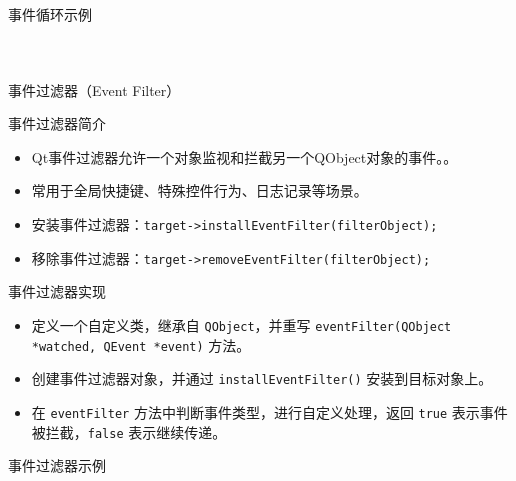 \documentclass[UTF8,aspectratio=169]{beamer}
\begin{document}
\begin{frame}[fragile]{事件循环示例}
    \begin{columns}
        \begin{column}{0.48\textwidth}
            \inputminted[firstline=1,lastline=20]{cpp}{code/qt_event_loop_example.cpp}
        \end{column}
        \begin{column}{0.48\textwidth}
            \inputminted[firstline=21,lastline=40]{cpp}{code/qt_event_loop_example.cpp}
        \end{column}
    \end{columns}
\end{frame}

\begin{frame}[fragile]{事件过滤器（Event Filter）}
    \begin{ytublock}{事件过滤器简介}
        \begin{itemize}
            \item Qt事件过滤器允许一个对象监视和拦截另一个QObject对象的事件。。
            \item 常用于全局快捷键、特殊控件行为、日志记录等场景。
            \item 安装事件过滤器：\texttt{target->installEventFilter(filterObject);}
            \item 移除事件过滤器：\texttt{target->removeEventFilter(filterObject);}
        \end{itemize}
    \end{ytublock}
    \begin{ytublock}{事件过滤器实现}
        \begin{itemize}
            \item 定义一个自定义类，继承自 \texttt{QObject}，并重写 \texttt{eventFilter(QObject *watched, QEvent *event)} 方法。
            \item 创建事件过滤器对象，并通过 \texttt{installEventFilter()} 安装到目标对象上。
            \item 在 \texttt{eventFilter} 方法中判断事件类型，进行自定义处理，返回 \texttt{true} 表示事件被拦截，\texttt{false} 表示继续传递。
        \end{itemize}
    \end{ytublock}
\end{frame}

\begin{frame}[fragile]{事件过滤器示例}
    \begin{columns}
        \begin{column}{0.48\textwidth}
            \inputminted[firstline=1,lastline=19]{cpp}{code/qt_event_filter_example.cpp}
        \end{column}
        \begin{column}{0.48\textwidth}
            \inputminted[firstline=20,lastline=38]{cpp}{code/qt_event_filter_example.cpp}
        \end{column}
    \end{columns}
\end{frame}
\end{document}
